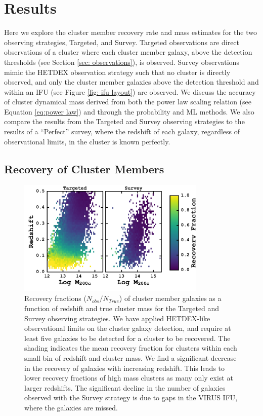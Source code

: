 \section{Results}\label{sec:results}
Here we explore the cluster member recovery rate and mass estimates for the two observing strategies, Targeted, and Survey. Targeted observations are direct observations of a cluster where each cluster member galaxy, above the detection thresholds (see Section \ref{sec: observations}), is observed. Survey observations mimic the HETDEX observation strategy such that no cluster is directly observed, and only the cluster member galaxies above the detection threshold and within an IFU (see Figure \ref{fig: ifu layout}) are observed.  We discuss the accuracy of cluster dynamical mass derived from both the power law scaling relation (see Equation \ref{eq:power law}) and through the probability and ML methods. We also compare the results from the Targeted and Survey observing strategies to the results of a ``Perfect'' survey, where the redshift of each galaxy, regardless of observational limits, in the cluster is known perfectly.

\subsection{Recovery of Cluster Members}
\begin{figure}[t]
	\begin{center}
		\includegraphics[width=0.8\textwidth]{figures1/recovery.pdf} 
	\end{center}
\caption[Recovery fractions for the Targeted and Survey observations.]{Recovery fractions ($N_{obs}/N_{True}$) of cluster member galaxies as a function of redshift and true cluster mass for the Targeted and Survey observing strategies. We have applied HETDEX-like observational limits on the cluster galaxy detection, and require at least five galaxies to be detected for a cluster to be recovered. The shading indicates the mean recovery fraction for clusters within each small bin of redshift and cluster mass. We find a significant decrease in the recovery of galaxies with increasing redshift. This leads to lower recovery fractions of high mass clusters as many only exist at larger redshifts. The significant decline in the number of galaxies observed with the Survey strategy is due to gaps in the VIRUS IFU, where the galaxies are missed.} 
	\label{fig: recovery} 
\end{figure}

